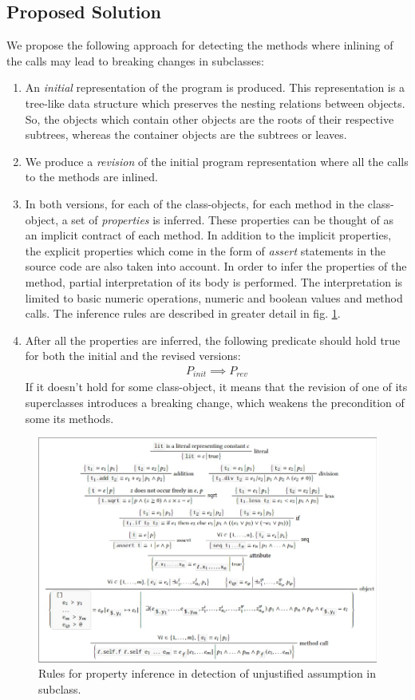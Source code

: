 \subsection{Proposed Solution}
We propose the following approach for detecting the methods where inlining of the calls may lead to breaking changes in subclasses:
\begin{enumerate}
    \item An \textit{initial} representation of the program is produced. This representation is a tree-like data structure which preserves the nesting relations between objects. So, the objects which contain other objects are the roots of their respective subtrees, whereas the container objects are the subtrees or leaves.
    \item We produce a \textit{revision} of the initial program representation where all the calls to the methods are inlined.
    \item In both versions, for each of the class-objects, for each method in the class-object, a set of \textit{properties} is inferred.  These properties can be thought of as an implicit contract \cite{meyer} of each method. In addition to the implicit properties, the explicit properties which come in the form of \textit{assert} statements in the source code are also taken into account. In order to infer the properties of the method, partial interpretation of its body is performed. The interpretation is limited to basic numeric operations, numeric and boolean values and method calls. The inference rules are described in greater detail in fig. \ref{fig:props}.
    \item After all the properties are inferred, the following predicate should hold true for both the initial and the revised versions:
          \begin{align*}
              P_{init} \implies P_{rev}
          \end{align*}
          If it doesn't hold for some class-object, it means that the revision of one of its superclasses introduces a breaking change, which weakens the precondition of some its methods.
\end{enumerate}

\begin{figure}
    \includegraphics[width=\textwidth]{figs/properties}
    \caption{Rules for property inference in detection of unjustified assumption in subclass.}
    \label{fig:props}
\end{figure}

